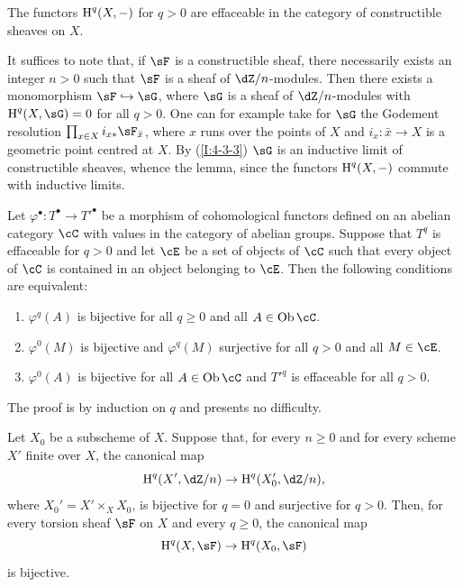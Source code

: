 \begin{lemma}\label{I:4-3-5}
The functors $\operatorname{H}^q(X,-)$ for $q>0$ are effaceable in the category of
constructible sheaves on $X$.
\end{lemma}

It suffices to note that, if $\sF$ is a constructible sheaf, there necessarily
exists an integer $n>0$ such that $\sF$ is a sheaf of
$\dZ/n$-modules. Then there exists a monomorphism $\sF\hookrightarrow \sG$, where
$\sG$ is a sheaf of $\dZ/n$-modules with $\h^q(X,\sG) = 0$ for all $q>0$.
One can for example take for $\sG$ the Godement resolution
$\prod_{x\in X} i_{x*} \sF_{\bar x}$, where $x$ runs over the points of $X$ and
$i_x:\bar x\to X$ is a geometric point centred at $X$. By
(\ref{I:4-3-3}) $\sG$ is an inductive limit of constructible sheaves, whence the
lemma, since the functors $\operatorname{H}^q(X,-)$ commute with inductive limits. 





\begin{lemma}\label{I:4-3-6}
Let $\varphi^\bullet:T^\bullet\to {T'}^\bullet$ be a morphism of cohomological
functors defined on an abelian category $\cC$ with values
in the category of abelian groups. Suppose that $T^q$ is effaceable
for $q>0$ and let $\cE$ be a set of objects of $\cC$ such that every object
of $\cC$ is contained in an object belonging to $\cE$. Then the
following conditions are equivalent:
\begin{enumerate}[\indent (i)]
  \item $\varphi^q(A)$ is bijective for all $q\geqslant 0$ and all
    $A\in\ob \cC$.
  \item $\varphi^0(M)$ is bijective and $\varphi^q(M)$ surjective for all
    $q>0$ and all $M\in\cE$.
  \item $\varphi^0(A)$ is bijective for all $A\in\ob \cC$ and ${T'}^q$ is
    effaceable for all $q>0$.
\end{enumerate}
\end{lemma}

The proof is by induction on $q$ and presents no difficulty. 





\begin{proposition}\label{I:4-3-7}
Let $X_0$ be a subscheme of $X$. Suppose that, for every $n\geqslant 0$ and
for every scheme $X'$ finite over $X$, the canonical map
\[
  \h^q(X',\dZ/n) \to \h^q(X_0',\dZ/n)\text{,}
\]
where $X_0' = X'\times_X X_0$, is bijective for $q=0$ and surjective for
$q>0$. Then, for every torsion sheaf $\sF$ on $X$ and every
$q\geqslant 0$, the canonical map
\[
  \h^q(X,\sF) \to \h^q(X_0,\sF)
\]
is bijective.
\end{proposition}

